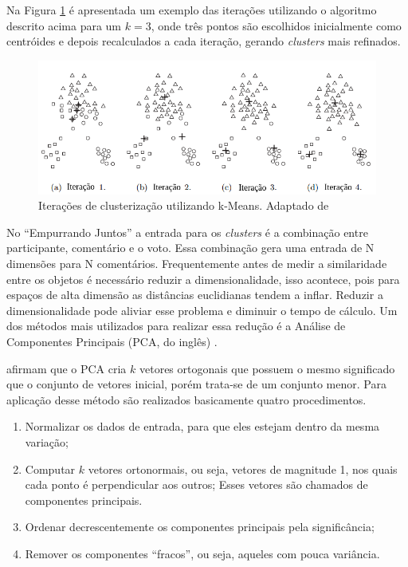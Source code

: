 Na Figura \ref{fig:iteracoes_kmeans} é apresentada um exemplo das iterações utilizando o algoritmo descrito acima para um $k = 3$,
onde três pontos são escolhidos inicialmente como centróides e depois recalculados a cada iteração, gerando \textit{clusters} mais
refinados.

\begin{figure}[h!]
\centering
\includegraphics[scale=0.6]{figuras/iteracoes_kmeans.png}
\caption{Iterações de clusterização utilizando k-Means. Adaptado de }
\label{fig:iteracoes_kmeans}
\end{figure}

No ``Empurrando Juntos'' a entrada para os \textit{clusters} é a combinação entre participante,  
comentário e o voto. Essa combinação gera uma entrada de N dimensões para N comentários.
Frequentemente antes de medir a similaridade entre os objetos é necessário
reduzir a dimensionalidade, isso acontece, pois para espaços de alta dimensão as distâncias euclidianas
tendem a inflar. Reduzir a dimensionalidade pode aliviar esse problema e diminuir o tempo de cálculo.
Um dos métodos mais utilizados para realizar essa redução é a Análise de 
Componentes Principais (PCA, do inglês) \cite{han2011data, sklearn}.


 afirmam que o PCA cria $k$ vetores ortogonais que possuem o mesmo significado que o conjunto
de vetores inicial, porém trata-se de um conjunto menor. Para aplicação desse método são realizados basicamente quatro procedimentos.

\begin{enumerate}
 \item Normalizar os dados de entrada, para que eles estejam dentro da mesma variação;
 \item Computar $k$ vetores ortonormais, ou seja, vetores de magnitude 1, nos quais cada ponto é perpendicular aos outros;
  \subitem Esses vetores são chamados de componentes principais.
 \item Ordenar decrescentemente os componentes principais pela significância;
 \item Remover os componentes ``fracos'', ou seja, aqueles com pouca variância.
\end{enumerate}

